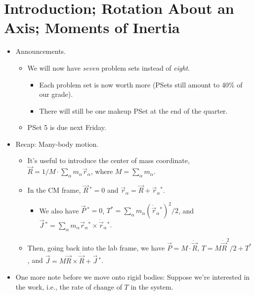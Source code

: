 \documentclass[../notes.tex]{subfiles}
\begin{document}




\section{Introduction; Rotation About an Axis; Moments of Inertia}
\begin{itemize}
    \item {}Announcements.
    \begin{itemize}
        \item We will now have \emph{seven} problem sets instead of \emph{eight}.
        \begin{itemize}
            \item Each problem set is now worth more (PSets still amount to 40\% of our grade).
            \item There will still be one makeup PSet at the end of the quarter.
        \end{itemize}
        \item PSet 5 is due next Friday.
    \end{itemize}
    \item Recap: Many-body motion.
    \begin{itemize}
        \item It's useful to introduce the center of mass coordinate, $\vec{R}=1/M\cdot\sum_\alpha m_\alpha\vec{r}_\alpha$, where $M=\sum_\alpha m_\alpha$.
        \item In the CM frame, $\vec{R}{\,}^*=0$ and $\vec{r}_\alpha=\vec{R}+\vec{r}_\alpha{}^*$.
        \begin{itemize}
            \item We also have $\vec{P}{\,}^*=0$, $T^*=\sum_\alpha m_\alpha(\dot{\vec{r}}_\alpha{}^*)^2/2$, and $\vec{J}{\,}^*=\sum_\alpha m_\alpha\vec{r}_\alpha{}^*\times\dot{\vec{r}}_\alpha{}^*$.
        \end{itemize}
        \item Then, going back into the lab frame, we have $\vec{P}=M\cdot\dot{\vec{R}}$, $T=M\dot{\vec{R}}^2/2+T^*$, and $\vec{J}=M\vec{R}\times\dot{\vec{R}}+\vec{J}{\,}^*$.
    \end{itemize}
    \item One more note before we move onto rigid bodies: Suppose we're interested in the work, i.e., the rate of change of $T$ in the system.
    \begin{itemize}

\end{itemize}
\end{itemize}
\end{document}
